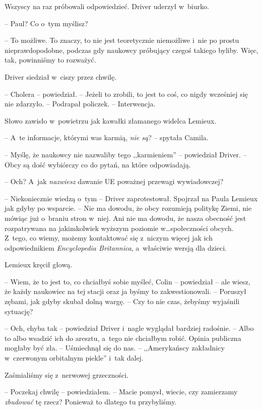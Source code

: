 \documentclass[oneside,polish,12pt,sfheadings]{mwbk}
\begin{document}
Wszyscy na raz próbowali odpowiedzieć. Driver uderzył w~biurko.

-- Paul? Co o~tym myślisz?

-- To możliwe. To znaczy, to nie jest teoretycznie niemożliwe i~nie po
prostu nieprawdopodobne, podczas gdy naukowcy próbujący czegoś takiego
byliby. Więc, tak, powinniśmy to rozważyć.

Driver siedział w~ciszy przez chwilę.

-- Cholera -- powiedział. -- Jeżeli to zrobili, to jest to coś, co nigdy
wcześniej się nie zdarzyło. -- Podrapał policzek. -- Interwencja.

Słowo zawisło w~powietrzu jak kawałki złamanego widelca Lemieux.

-- A~te informacje, którymi was karmią, \emph{nie są}? -- spytała Camila.

-- Myślę, że naukowcy nie nazwaliby tego ,,karmieniem'' -- powiedział
Driver. -- Obcy są dość wybiórczy co do pytań, na które odpowiadają.

-- Och? A~jak \emph{nazwiesz} dawanie UE poważnej przewagi wywiadowczej?

-- Niekoniecznie wiedzą o~tym -- Driver zaprotestował. Spojrzał na Paula
Lemieux jak gdyby po wsparcie. -- Nie ma dowodu, że obcy rozumieją
politykę Ziemi, nie mówiąc już o~braniu stron w~niej. Ani nie ma dowodu,
że nasza obecność jest rozpatrywana na jakimkolwiek wyższym poziomie w\ldots społeczności obcych. Z~tego, co wiemy, możemy kontaktować się z~niczym więcej jak ich odpowiednikiem \emph{Encyclopedia Britannica}, a~właściwie wersją dla dzieci.

Lemieux kręcił głową. 

-- Wiem, że to jest to, co chciałbyś sobie myśleć,
Colin -- powiedział -- ale wiesz, że każdy naukowiec na tej stacji oraz ja
byśmy to zakwestionowali. -- Poruszył zębami, jak gdyby skubał dolną
wargę. -- Czy to nie czas, żebyśmy wyjaśnili sytuację?

-- Och, chyba tak -- powiedział Driver i~nagle wyglądał bardziej radośnie.
-- Albo to albo wsadzić ich do aresztu, a~tego nie chciałbym robić. Opinia
publiczna mogłaby być zła. -- Uśmiechnął się do nas. -- ,,Amerykańscy
zakładnicy w~czerwonym orbitalnym piekle'' i~tak dalej.

Zaśmialiśmy się z~nerwowej grzeczności.

-- Poczekaj chwilę -- powiedziałem. -- Macie pomysł, wiecie, czy zamierzamy
\emph{zbudować} tę rzecz? Ponieważ to dlatego tu przybyliśmy.
\end{document}
